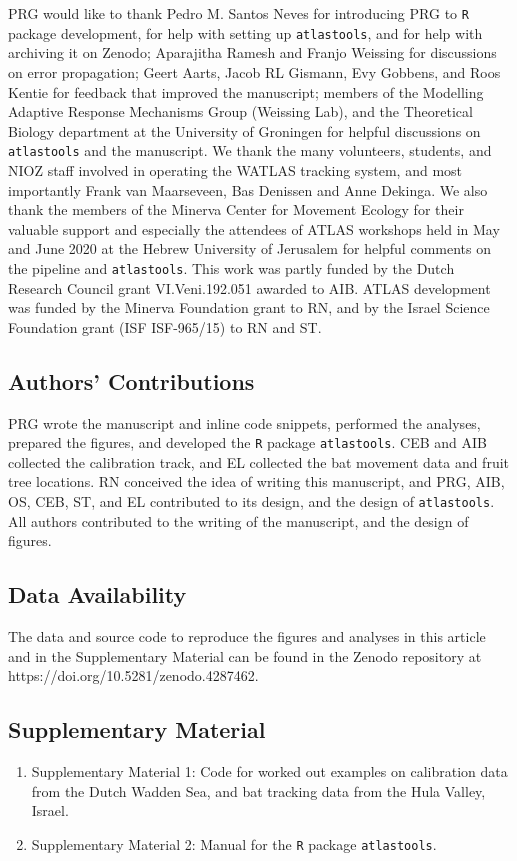 \documentclass[10pt,paper=a4,headings=standardclasses
]{scrartcl}
\begin{document}
PRG would like to thank Pedro M. Santos Neves for introducing PRG to \texttt{R} package development, for help with setting up \texttt{atlastools}, and for help with archiving it on Zenodo; 
Aparajitha Ramesh and Franjo Weissing for discussions on error propagation;
Geert Aarts, Jacob RL Gismann, Evy Gobbens, and Roos Kentie for feedback that improved the manuscript; 
members of the Modelling Adaptive Response Mechanisms Group (Weissing Lab), and the Theoretical Biology department at the University of Groningen for helpful discussions on \texttt{atlastools} and the manuscript.
We thank the many volunteers, students, and NIOZ staff involved in operating the WATLAS tracking system, and most importantly Frank van Maarseveen, Bas Denissen and Anne Dekinga.
We also thank the members of the Minerva Center for Movement Ecology for their valuable support and especially the attendees of ATLAS workshops held in May and June 2020 at the Hebrew University of Jerusalem for helpful comments on the pipeline and \texttt{atlastools}.
This work was partly funded by the Dutch Research Council grant VI.Veni.192.051 awarded to AIB. ATLAS development was funded by the Minerva Foundation grant to RN, and by the Israel Science Foundation grant (ISF ISF-965/15) to RN and ST.

\subsection{Authors' Contributions}

PRG wrote the manuscript and inline code snippets, performed the analyses, prepared the figures, and developed the \texttt{R} package \texttt{atlastools}.
CEB and AIB collected the calibration track, and EL collected the bat movement data and fruit tree locations.
RN conceived the idea of writing this manuscript, and PRG, AIB, OS, CEB, ST, and EL contributed to its design, and the design of \texttt{atlastools}.
All authors contributed to the writing of the manuscript, and the design of figures.

\subsection{Data Availability}

The data and source code to reproduce the figures and analyses in this article and in the Supplementary Material can be found in the Zenodo repository at https://doi.org/10.5281/zenodo.4287462.

\subsection{Supplementary Material}
\begin{enumerate}
    \item Supplementary Material 1: Code for worked out examples on calibration data from the Dutch Wadden Sea, and bat tracking data from the Hula Valley, Israel.
    \item Supplementary Material 2: Manual for the \texttt{R} package \texttt{atlastools}.
\end{enumerate}
\end{document}
